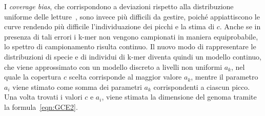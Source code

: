 \documentclass[crop=false, class=book]{standalone}
\begin{document}
	I \textit{coverage bias}, che corrispondono a deviazioni rispetto alla distribuzione uniforme delle letture~\cite{ross2013characterizing}, sono invece più difficili da gestire, poiché appiattiscono le curve rendendo più difficile l'individuazione dei picchi e la stima di $c$. Anche se in presenza di tali errori i k-mer non vengono campionati in maniera equiprobabile, lo spettro di campionamento risulta continuo. Il nuovo modo di rappresentare le distribuzioni di specie e di individui di k-mer diventa quindi un modello continuo, che viene approssimato con un modello discreto a livelli non uniformi $a_k$, nel quale la copertura $c$ scelta corrisponde al maggior valore $a_k$, mentre il parametro $a_i$ viene stimato come somma dei parametri $a_k$ corrispondenti a ciascun picco. Una volta trovati i valori $c$ e $a_i$, viene stimata la dimensione del genoma tramite la formula~\vref{eqn:GCE2}. 
	
\end{document}
